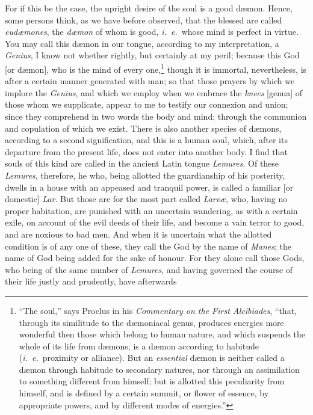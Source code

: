 \documentclass{article}
\begin{document}
\noindent For if this be the case, the upright desire of the soul is a good
d{\ae}mon. Hence, some persons think, as we have before observed, that the
blessed are called \textit{eud{\ae}mones}, the \textit{d{\ae}mon} of whom is
good, \textit{i.~e.}~whose mind is perfect in virtue. You may call this
d{\ae}mon in our tongue, according to my interpretation, a \textit{Genius}, I
know not whether rightly, but certainly at my peril; because this God [or
d{\ae}mon], who is the mind of every one,\footnote{``The soul,'' says Proclus
in his \textit{Commentary on the First Alcibiades}, ``that, through its
similitude to the d{\ae}moniacal genus, produces energies more wonderful then
those which belong to human nature, and which suspends the whole of its life
from d{\ae}mons, is a d{\ae}mon according to habitude (\textit{i.~e.}~proximity
or alliance). But an \textit{essential} d{\ae}mon is neither called a d{\ae}mon
through habitude to secondary natures, nor through an assimilation to something
different from himself; but is allotted this peculiarity from himself, and is
defined by a certain summit, or flower of essence, by appropriate powers, and
by different modes of energies.''} though it is immortal, nevertheless, is
after a certain manner generated with man; so that those prayers by which we
implore the \textit{Genius}, and which we employ when we embrace the
\textit{knees} [genua] of those whom we supplicate, appear to me to testify our
connexion and union; since they comprehend in two words the body and mind;
through the communion and copulation of which we exist. There is also another
species of d{\ae}mons, according to a second signification, and this is a human
soul, which, after its departure from the present life, does not enter into
another body. I find that souls of this kind are called in the ancient Latin
tongue \textit{Lemures}. Of these \textit{Lemures}, therefore, he who, being
allotted the guardianship of his posterity, dwells in a house with an appeased
and tranquil power, is called a familiar [or domestic] \textit{Lar}. But those
are for the most part called \textit{Larv{\ae}}, who, having no proper
habitation, are punished with an uncertain wandering, as with a certain exile,
on account of the evil deeds of their life, and become a vain terror to good,
and are noxious to bad men. And when it is uncertain what the allotted
condition is of any one of these, they call the God by the name of
\textit{Manes}; the name of God being added for the sake of honour. For they
alone call those Gods, who being of the same number of \textit{Lemures}, and
having governed the course of their life justly and prudently, have afterwards
\end{document}

